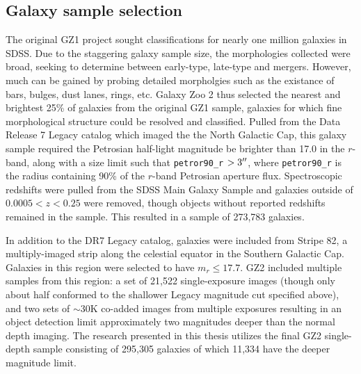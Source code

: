 \subsection{Galaxy sample selection}
The original GZ1 project sought classifications for nearly one million galaxies in SDSS. Due to the staggering galaxy sample size, the morphologies collected were broad, seeking to determine between early-type, late-type and mergers. However, much can be gained by probing detailed morpholgies such as the existance of bars, bulges, dust lanes, rings, etc. Galaxy Zoo 2 thus selected the nearest and brightest 25\% of galaxies from the original GZ1 sample, galaxies for which fine morphological structure could be resolved and classified. Pulled from the Data Release 7 Legacy catalog \citep{Abazajian2009} which imaged the the North Galactic Cap, this galaxy sample required the Petrosian half-light magnitude be brighter than 17.0 in the $r$-band, along with a size limit such that \texttt{petror90\_r} $>3\mbox{$^{\prime\prime}$}$, where \texttt{petror90\_r} is the radius containing 90\% of the $r$-band Petrosian aperture flux. Spectroscopic redshifts were pulled from the SDSS Main Galaxy Sample \citep{Strauss2002} and galaxies outside of $0.0005 < z < 0.25$ were removed, though objects without reported redshifts remained in the sample. This resulted in a sample of 273,783 galaxies. 

In addition to the DR7 Legacy catalog, galaxies were included from Stripe 82, a multiply-imaged strip along the celestial equator in the Southern Galactic Cap. Galaxies in this region were selected to have $m_r\le17.7$. GZ2 included multiple samples from this region: a set of 21,522 single-exposure images (though only about half conformed to the shallower Legacy magnitude cut specified above), and two sets of $\sim$30K co-added images from multiple exposures resulting in an object detection limit approximately two magnitudes deeper than the normal depth imaging. The research presented in this thesis utilizes the final GZ2 single-depth sample consisting of 295,305 galaxies of which 11,334 have the deeper magnitude limit. 


